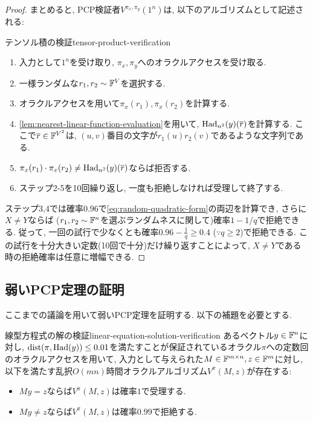 \begin{proof}
  まとめると, PCP検証者$V^{\pi_x,\pi_y}(1^n)$は, 以下のアルゴリズムとして記述される:
  \begin{algorithm}{テンソル積の検証}{tensor-product-verification}
    \begin{enumerate}
      \item 入力として$1^n$を受け取り, $\pi_x,\pi_y$へのオラクルアクセスを受け取る.
      \item 一様ランダムな$r_1,r_2\sim\mathbb{F}^V$を選択する.
      \item オラクルアクセスを用いて$\pi_x(r_1),\pi_x(r_2)$を計算する.
      \item \cref{lem:nearest-linear-function-evaluation}を用いて, $\mathrm{Had}_{n^2}(y)(\overline{r})$を計算する. ここで$\overline{r}\in\mathbb{F}^{V^2}$は, $(u,v)$番目の文字が$r_1(u)r_2(v)$であるような文字列である.
      \item $\pi_x(r_1)\cdot \pi_x(r_2)\ne \mathrm{Had}_{n^2}(y)(\overline{r})$ならば拒否する.
      \item ステップ2-5を10回繰り返し, 一度も拒絶しなければ受理して終了する.
    \end{enumerate}
  \end{algorithm}

  ステップ3,4では確率$0.96$で\cref{eq:random-quadratic-form}の両辺を計算でき,
  さらに$X\ne Y$ならば ($r_1,r_2\sim\mathbb{F}^n$を選ぶランダムネスに関して)確率$1-1/q$で拒絶できる.
  従って, 一回の試行で少なくとも確率$0.96-\frac{1}{q} \ge 0.4$ ($\because q\ge 2$)で拒絶できる.
  この試行を十分大きい定数(10回で十分)だけ繰り返すことによって, $X\ne Y$である時の拒絶確率は任意に増幅できる.
  \end{proof}
  
  \subsection{弱いPCP定理の証明}  
  ここまでの議論を用いて弱いPCP定理を証明する. 以下の補題を必要とする.

  \begin{lemma}{線型方程式の解の検証}{linear-equation-solution-verification}
    あるベクトル$y\in\mathbb{F}^n$に対し, $\mathrm{dist}(\pi,\mathrm{Had}(y))\le 0.01$を満たすことが保証されているオラクル$\pi$への定数回のオラクルアクセスを用いて, 入力として与えられた$M\in\mathbb{F}^{m\times n},z\in\mathbb{F}^m$に対し, 
    以下を満たす乱択$O(mn)$時間オラクルアルゴリズム$V^{\pi}(M,z)$が存在する:
    \begin{itemize}
      \item $My=z$ならば$V^{\pi}(M,z)$は確率$1$で受理する.
      \item $My\ne z$ならば$V^{\pi}(M,z)$は確率$0.99$で拒絶する.        
    \end{itemize}
  \end{lemma}

